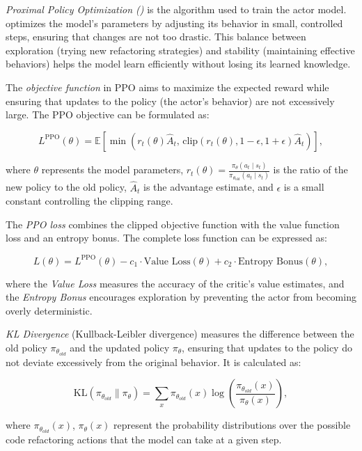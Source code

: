 \textit{Proximal Policy Optimization (\ppo{})} is the algorithm used to train the actor model. \ppo{} optimizes the model's parameters by adjusting its behavior in small, controlled steps, ensuring that changes are not too drastic. This balance between exploration (trying new refactoring strategies) and stability (maintaining effective behaviors) helps the model learn efficiently without losing its learned knowledge.

The \textit{objective function} in PPO aims to maximize the expected reward while ensuring that updates to the policy (the actor's behavior) are not excessively large. The PPO objective can be formulated as:

\[
L^{\text{PPO}}(\theta) = \mathbb{E} \left[ \min \left( r_t(\theta) \hat{A}_t, \, \text{clip}(r_t(\theta), 1 - \epsilon, 1 + \epsilon) \hat{A}_t \right) \right],
\]

where \( \theta \) represents the model parameters, \( r_t(\theta) = \frac{\pi_\theta(a_t \mid s_t)}{\pi_{\theta_{\text{old}}}(a_t \mid s_t)} \) is the ratio of the new policy to the old policy, \( \hat{A}_t \) is the advantage estimate, and \( \epsilon \) is a small constant controlling the clipping range.

%  

The \textit{PPO loss} combines the clipped objective function with the value function loss and an entropy bonus. The complete loss function can be expressed as:

\[
L(\theta) = L^{\text{PPO}}(\theta) - c_1 \cdot \text{Value Loss}(\theta) + c_2 \cdot \text{Entropy Bonus}(\theta),
\]

where the \textit{Value Loss} measures the accuracy of the critic's value estimates, and the \textit{Entropy Bonus} encourages exploration by preventing the actor from becoming overly deterministic.

\textit{KL Divergence} (Kullback-Leibler divergence) measures the difference between the old policy $\pi_{\theta_{old}}$ and the updated policy $\pi_\theta$, ensuring that updates to the policy do not deviate excessively from the original behavior. It is calculated as:

\begin{equation} \label{eq:kl_div}
\text{KL}(\pi_{\theta_{old}} \parallel \pi_{\theta}) = \sum_{x} \pi_{\theta_{old}}(x) \log \left( \frac{\pi_{\theta_{old}}(x)}{\pi_{\theta}(x)} \right),
\end{equation}

where $\pi_{\theta_{old}}(x)$, $\pi_\theta(x)$ represent the probability distributions over the possible code refactoring actions that the model can take at a given step.


